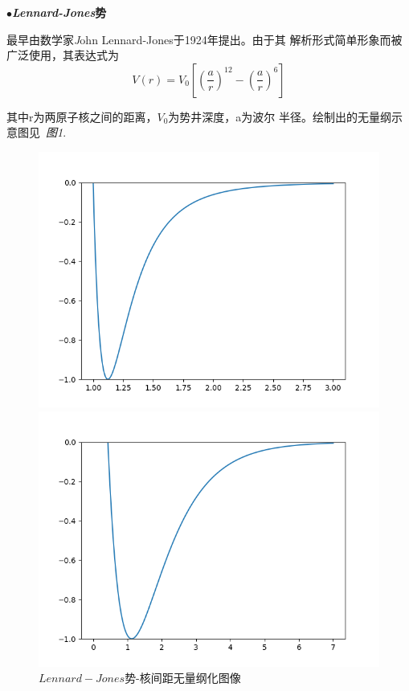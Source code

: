 \documentclass[11pt, a4paper, oneside]{ctexart}
\begin{document}
{{$\bullet${}\bfseries{\emph{Lennard-Jones}势}}


{
    最早由数学家{\emph John Lennard-Jones}于1924年提出。由于其
    解析形式简单形象而被广泛使用，其表达式为
\begin{equation}
    V(r)=V_0[(\frac{a}{r})^{12}-(\frac{a}{r})^6]
\end{equation}


{其中r为两原子核之间的距离，$V_0$为势井深度，a为波尔
    半径。绘制出的无量纲示意图见\ \emph{图1}.}
}

{
    \begin{center}
          
        \begin{figure}[ht]\vspace{-2mm}
            \begin{minipage}[t]{0.5\linewidth}
            \centering
            \includegraphics[scale=0.5]{1.png}\vspace{-6mm}
            \caption{\small{ $Lennard-Jones$势-核间距无量纲化图像}}
            \end{minipage}%
            \begin{minipage}[t]{0.5\linewidth}
            \centering
            \includegraphics[scale=0.5]{2.png}\vspace{-6mm}

\end{minipage}
\end{figure}
\end{center}}}
\end{document}
